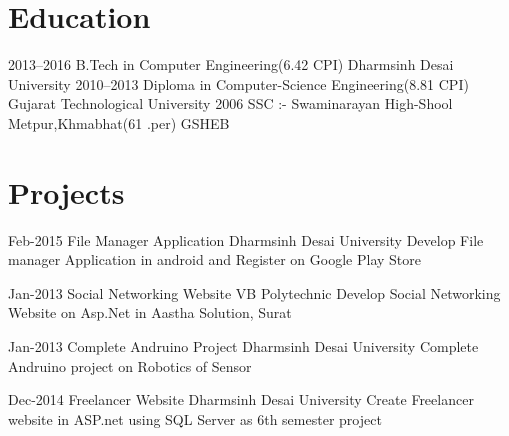 \documentclass[]{cv-style}          %
\begin{document}

\section{Education}

\begin{entrylist}
\entry
{2013--2016}
{B.Tech {\normalfont in Computer Engineering(6.42 CPI)}}
{Dharmsinh Desai University}
{\vspace{-0.3cm}}
\entry
{2010--2013}
{Diploma {\normalfont in Computer-Science Engineering(8.81 CPI)}}
{Gujarat Technological University}
{\vspace{-0.3cm}}
\entry
{2006}
{SSC :- {\normalfont Swaminarayan High-Shool Metpur,Khmabhat(61 .per)}}
{GSHEB}
{}

\end{entrylist}


\section{Projects}

\begin{entrylist}
\entry
{Feb-2015}
{File Manager Application }
{Dharmsinh Desai University}
{Develop File manager Application in android and Register on Google Play Store }
{\vspace{-0.3cm}}
\end{entrylist}

\begin{entrylist}
\entry
{Jan-2013}
{Social Networking Website}
{VB Polytechnic}
{Develop Social Networking Website on Asp.Net in Aastha Solution, Surat }
{\vspace{-0.3cm}}
\end{entrylist}

\begin{entrylist}
\entry
{Jan-2013}
{Complete Andruino Project }
{Dharmsinh Desai University}
{Complete Andruino project on Robotics of Sensor }
{\vspace{-0.3cm}}
\end{entrylist}
\begin{entrylist}
\entry
{Dec-2014}
{Freelancer Website}
{Dharmsinh Desai University}
{Create Freelancer website in ASP.net using SQL Server as 6th semester project}
{\vspace{-0.3cm}}


\end{entrylist}
\end{document}
